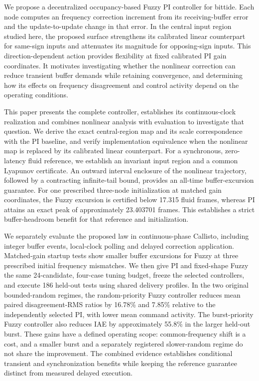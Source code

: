 We propose a decentralized occupancy-based Fuzzy PI controller for bittide. Each node computes an frequency correction increment from its receiving-buffer error and the update-to-update change in that error. In the central input region studied here, the proposed surface strengthens its calibrated linear counterpart for same-sign inputs and attenuates its magnitude for opposing-sign inputs. This direction-dependent action provides flexibility at fixed calibrated PI gain coordinates. It motivates investigating whether the nonlinear correction can reduce transient buffer demands while retaining convergence, and determining how its effects on frequency disagreement and control activity depend on the operating conditions.

This paper presents the complete controller, establishes its con\-tinuous-clock realization and combines nonlinear analysis with evaluation to investigate that question. We derive the exact central-region map and its scale correspondence with the PI baseline, and verify implementation equivalence when the nonlinear map is replaced by its calibrated linear counterpart. For a synchronous, zero-latency fluid reference, we establish an invariant input region and a common Lyapunov certificate. An outward interval enclosure of the nonlinear trajectory, followed by a contracting infinite-tail bound, provides an all-time buffer-excursion guarantee. For one prescribed three-node initialization at matched gain coordinates, the Fuzzy excursion is certified below 17.315 fluid frames, whereas PI attains an exact peak of approximately 23.403701 frames. This establishes a strict buffer-headroom benefit for that reference and initialization.

We separately evaluate the proposed law in continuous-phase Callisto,
including integer buffer events, local-clock polling and delayed
correction application. Matched-gain startup tests show smaller buffer
excursions for Fuzzy at three prescribed initial frequency mismatches.
We then give PI and fixed-shape Fuzzy the same 24-candidate,
four-case tuning budget, freeze the selected controllers, and execute
186 held-out tests using shared delivery profiles. In the two
original bounded-random regimes, the random-priority Fuzzy controller
reduces mean paired disagreement-RMS ratios by 16.78\% and 7.85\%
relative to the independently selected PI, with lower mean command
activity. The burst-priority Fuzzy controller also reduces IAE by
approximately 55.8\% in the larger held-out burst. These gains have
a defined operating scope: common-frequency shift is a cost, and a
smaller burst and a separately registered slower-random regime do not
share the improvement. The combined evidence establishes conditional
transient and synchronization benefits while keeping the reference
guarantee distinct from measured delayed execution.

